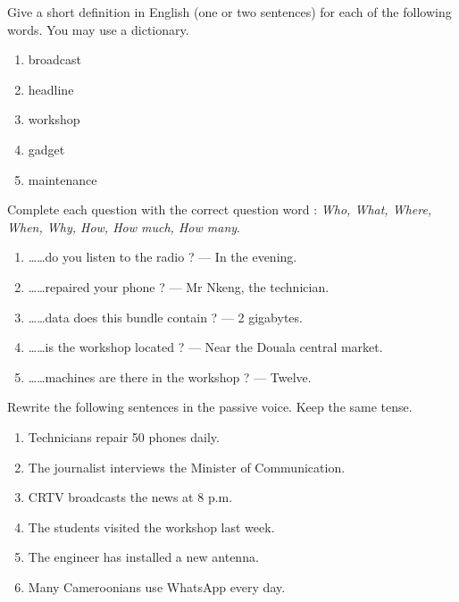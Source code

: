 \documentclass[11pt]{article}
\newcounter{popsec}
\newcounter{popsub}
\newcommand{\courssub}[1]{%
  \stepcounter{popsub}%
  \par\vspace{9pt}\noindent{\popxbold\fontsize{11.5}{13}\selectfont\color{popink}{\color{poporange}\thepopsec.\thepopsub}\hspace{6pt}#1}\par\nopagebreak\vspace{4pt}
}
\begin{document}
\begin{exercice}
Give a short definition in English (one or two sentences) for each of the following words. You may use a dictionary.

\begin{enumerate}
\item broadcast
\item headline
\item workshop
\item gadget
\item maintenance
\end{enumerate}
\end{exercice}

\begin{exercice}
Complete each question with the correct question word : \emph{Who, What, Where, When, Why, How, How much, How many}.

\begin{enumerate}
\item \ldots\ldots do you listen to the radio ? --- In the evening.
\item \ldots\ldots repaired your phone ? --- Mr Nkeng, the technician.
\item \ldots\ldots data does this bundle contain ? --- 2 gigabytes.
\item \ldots\ldots is the workshop located ? --- Near the Douala central market.
\item \ldots\ldots machines are there in the workshop ? --- Twelve.
\end{enumerate}
\end{exercice}

\courssub{Je m'entraîne}

\begin{exercice}
Rewrite the following sentences in the passive voice. Keep the same tense.

\begin{enumerate}
\item Technicians repair 50 phones daily.
\item The journalist interviews the Minister of Communication.
\item CRTV broadcasts the news at 8 p.m.
\item The students visited the workshop last week.
\item The engineer has installed a new antenna.
\item Many Cameroonians use WhatsApp every day.
\end{enumerate}
\end{exercice}
\end{document}

